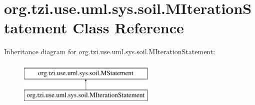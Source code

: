 \hypertarget{classorg_1_1tzi_1_1use_1_1uml_1_1sys_1_1soil_1_1_m_iteration_statement}{\section{org.\-tzi.\-use.\-uml.\-sys.\-soil.\-M\-Iteration\-Statement Class Reference}
\label{classorg_1_1tzi_1_1use_1_1uml_1_1sys_1_1soil_1_1_m_iteration_statement}
}
Inheritance diagram for org.\-tzi.\-use.\-uml.\-sys.\-soil.\-M\-Iteration\-Statement\-:\begin{figure}[H]
\begin{center}
\leavevmode
\includegraphics[height=2.000000cm]{classorg_1_1tzi_1_1use_1_1uml_1_1sys_1_1soil_1_1_m_iteration_statement}
\end{center}
\end{figure}
